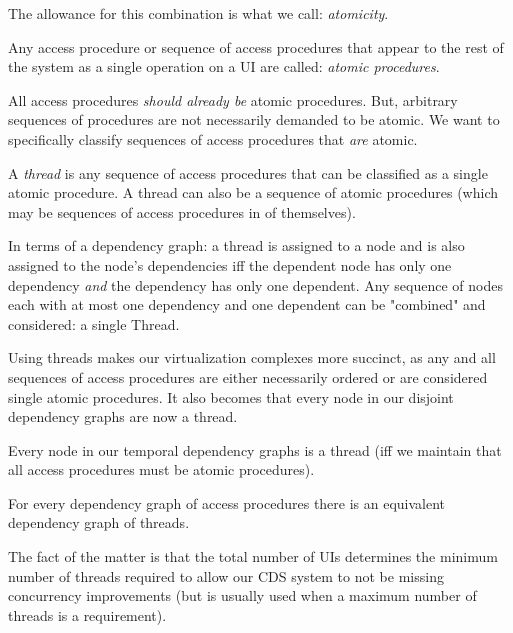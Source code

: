 The allowance for this combination is what we call: \textit{atomicity}.

\begin{con-def}
	\label{atomic-procedures}
	Any access procedure or sequence of access procedures that appear to the rest of the system as a single operation on a UI are called: \textit{atomic procedures}.
\end{con-def}

All access procedures \textit{should already be} atomic procedures. But, arbitrary sequences of procedures are not necessarily demanded to be atomic. We want to specifically classify sequences of access procedures that \textit{are} atomic.

\begin{con-def}[Thread]
	\label{thread}
	A \textit{thread} is any sequence of access procedures that can be classified as a single atomic procedure. A thread can also be a  sequence of atomic procedures (which may be sequences of access procedures in of themselves).
\end{con-def}

In terms of a dependency graph: a thread is assigned to a node and is also assigned to the node's dependencies iff the dependent node has only one dependency \textit{and} the dependency has only one dependent. Any sequence of nodes each with at most one dependency and one dependent can be "combined" and considered: a single Thread.

Using threads makes our virtualization complexes more succinct, as any and all sequences of access procedures are either necessarily ordered or are considered single atomic procedures. It also becomes that every node in our disjoint dependency graphs are now a thread.

\begin{props}
	\label{nodes-are-threads}
	Every node in our temporal dependency graphs is a thread (iff we maintain that all access procedures must be atomic procedures).
\end{props}

\begin{con-cor}
	\label{thread-ddag}
	For every dependency graph of access procedures there is an equivalent dependency graph of threads.
\end{con-cor}

The fact of the matter is that the total number of UIs determines the minimum number of threads required to allow our CDS system to not be missing concurrency improvements (but is usually used when a maximum number of threads is a requirement).

